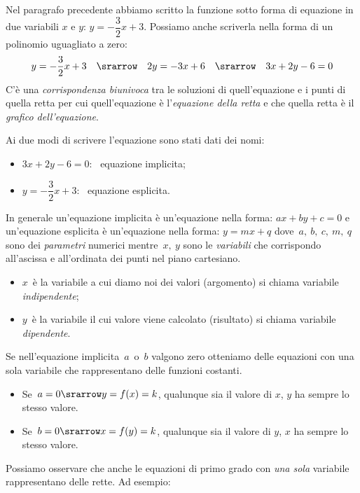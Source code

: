 Nel paragrafo precedente abbiamo scritto la funzione sotto forma di 
equazione in due variabili \(x\) e \(y\): \(y=-\dfrac{3}{2}x+3\).
Possiamo anche scriverla 
nella forma di un polinomio uguagliato a zero:
\[y=-\frac{3}{2}x+3 \quad \srarrow \quad 2y = -3x +6 \quad \srarrow \quad 
  3x +2y -6 = 0\]
C'è una \emph{corrispondenza biunivoca} tra le 
soluzioni di quell'equazione e i punti di quella retta per cui  
quell'equazione è l'\emph{equazione della retta} e che quella retta è il 
\emph{grafico dell'equazione}.

Ai due modi di scrivere l'equazione sono stati dati dei nomi:

\begin{multicols}{2}
\begin{itemize} [nosep]
 \item \(3x + 2y - 6 = 0\):~ equazione implicita;
 \item \(y = -\dfrac{3}{2}x +3\):~ equazione esplicita.
\end{itemize}
\end{multicols}

In generale un'equazione implicita è un'equazione nella forma: \quad
\(ax + by + c = 0\)
e un'equazione esplicita è un'equazione nella forma: \quad
\(y = mx + q\)
dove~\(a,~b,~c,~m,~q\) sono dei \emph{parametri} numerici mentre~\(x,~y\) 
sono le \emph{variabili} che corrispondo all'ascissa e all'ordinata dei punti 
nel piano cartesiano.

\begin{itemize} [noitemsep]
 \item \(x\)~è la variabile a cui diamo noi dei valori (argomento) si chiama 
  variabile \emph{indipendente};
 \item \(y\)~è la variabile il cui valore viene calcolato (risultato) si 
chiama variabile \emph{dipendente}.
\end{itemize}

Se nell'equazione implicita~\(a\)~o~\(b\) valgono zero otteniamo delle 
equazioni con una sola variabile che rappresentano delle funzioni costanti.
\begin{itemize} [noitemsep]
\item 
Se~\(a=0 \srarrow y=f(x)=k\), qualunque sia 
il valore di \(x\), \(y\) ha sempre lo stesso valore.
\item 
Se~\(b=0 \srarrow x=f(y)=k\), qualunque sia 
il valore di \(y\), \(x\) ha sempre lo stesso valore.
\end{itemize}

Possiamo osservare che anche le equazioni di primo grado con 
\emph{una sola} variabile rappresentano delle rette. Ad esempio:

